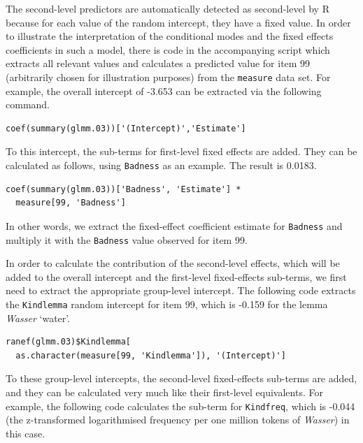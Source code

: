 The second-level predictors are automatically detected as second-level by R because for each value of the random intercept, they have a fixed value.
In order to illustrate the interpretation of the conditional modes and the fixed effects coefficients in such a model, there is code in the accompanying script which extracts all relevant values and calculates a predicted value for item 99 (arbitrarily chosen for illustration purposes) from the \texttt{measure} data set.
For example, the overall intercept of -3.653 can be extracted via the following command.

\vspace{0.5\baselineskip}

\begin{lstlisting}
coef(summary(glmm.03))['(Intercept)','Estimate']
\end{lstlisting}

To this intercept, the sub-terms for first-level fixed effects are added.
They can be calculated as follows, using \texttt{Badness} as an example.
The result is 0.0183.

\vspace{0.5\baselineskip}

\begin{lstlisting}
coef(summary(glmm.03))['Badness', 'Estimate'] *
  measure[99, 'Badness']
\end{lstlisting}

In other words, we extract the fixed-effect coefficient estimate for \texttt{Badness} and multiply it with the \texttt{Badness} value observed for item 99.

In order to calculate the contribution of the second-level effects, which will be added to the overall intercept and the first-level fixed-effects sub-terms, we first need to extract the appropriate group-level intercept.
The following code extracts the \texttt{Kindlemma} random intercept for item 99, which is -0.159 for the lemma \textit{Wasser} `water'.

\vspace{0.5\baselineskip}

\begin{lstlisting}
ranef(glmm.03)$Kindlemma[
  as.character(measure[99, 'Kindlemma']), '(Intercept)']
\end{lstlisting}

To these group-level intercepts, the second-level fixed-effects sub-terms are added, and they can be calculated very much like their first-level equivalents.
For example, the following code calculates the sub-term for \texttt{Kindfreq}, which is -0.044 (the z-transformed logarithmised frequency per one million tokens of \textit{Wasser}) in this case.

